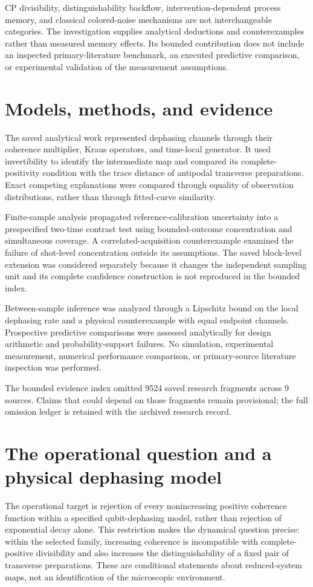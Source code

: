 \documentclass[11pt]{article}
\begin{document}
CP divisibility, distinguishability backflow, intervention-dependent process memory, and classical colored-noise mechanisms are not interchangeable categories. The investigation supplies analytical deductions and counterexamples rather than measured memory effects. Its bounded contribution does not include an inspected primary-literature benchmark, an executed predictive comparison, or experimental validation of the measurement assumptions.

\section{Models, methods, and evidence}
The saved analytical work represented dephasing channels through their coherence multiplier, Kraus operators, and time-local generator. It used invertibility to identify the intermediate map and compared its complete-positivity condition with the trace distance of antipodal transverse preparations. Exact competing explanations were compared through equality of observation distributions, rather than through fitted-curve similarity.

Finite-sample analysis propagated reference-calibration uncertainty into a prespecified two-time contrast test using bounded-outcome concentration and simultaneous coverage. A correlated-acquisition counterexample examined the failure of shot-level concentration outside its assumptions. The saved block-level extension was considered separately because it changes the independent sampling unit and its complete confidence construction is not reproduced in the bounded index.

Between-sample inference was analyzed through a Lipschitz bound on the local dephasing rate and a physical counterexample with equal endpoint channels. Prospective predictive comparisons were assessed analytically for design arithmetic and probability-support failures. No simulation, experimental measurement, numerical performance comparison, or primary-source literature inspection was performed.

The bounded evidence index omitted 9524 saved research fragments across 9 sources. Claims that could depend on those fragments remain provisional; the full omission ledger is retained with the archived research record.
\section{The operational question and a physical dephasing model}
The operational target is rejection of every nonincreasing positive coherence function within a specified qubit-dephasing model, rather than rejection of exponential decay alone. This restriction makes the dynamical question precise: within the selected family, increasing coherence is incompatible with complete-positive divisibility and also increases the distinguishability of a fixed pair of transverse preparations. These are conditional statements about reduced-system maps, not an identification of the microscopic environment.
\end{document}
